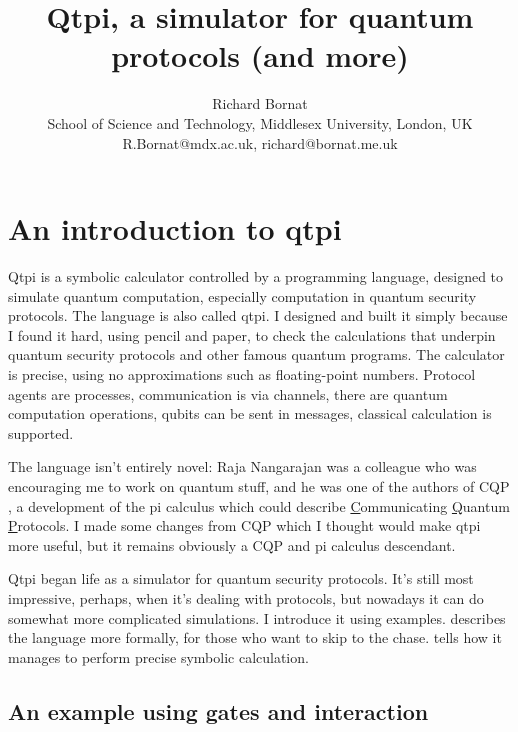 \documentclass[11pt,a4paper]{book}
\title{Qtpi, a simulator for quantum protocols (and more)}
\author{Richard Bornat \\ School of Science and Technology, Middlesex University, London, UK \\ R.Bornat@mdx.ac.uk, richard@bornat.me.uk}
\begin{document}
\maketitle
\newpage
\tableofcontents
\newpage
\chapter{An introduction to qtpi}

Qtpi is a symbolic calculator controlled by a programming language, designed to simulate quantum computation, especially computation in quantum security protocols. The language is also called qtpi.
I designed and built it simply because I found it hard, using pencil and paper, to check the calculations that underpin quantum security protocols and other famous quantum programs. The calculator is precise, using no approximations such as floating-point numbers. Protocol agents are processes, communication is via channels, there are quantum computation operations, qubits can be sent in messages, classical calculation is supported. 

The language isn't entirely novel: Raja Nangarajan was a colleague who was encouraging me to work on quantum stuff, and he was one of the authors of CQP \citep{GaySJ:comqp}, a development of the pi calculus \citep{DBLP:journals/iandc/MilnerPW92a} which could describe \underline{C}ommunicating \underline{Q}uantum \underline{P}rotocols. I made some changes from CQP which I thought would make qtpi more useful, but it remains obviously a CQP and pi calculus descendant. 

Qtpi began life as a simulator for quantum security protocols. It's still most impressive, perhaps, when it's dealing with protocols, but nowadays it can do somewhat more complicated simulations. I introduce it using examples.  describes the language more formally, for those who want to skip to the chase.  tells how it manages to perform precise symbolic calculation.

\section{An example using gates and interaction}
\end{document}
